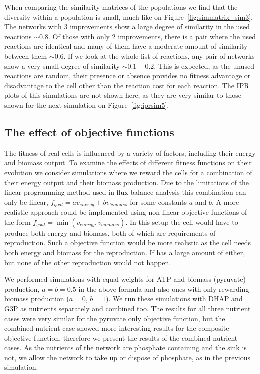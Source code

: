\documentclass[a4paper,12pt]{article}
\begin{document}
When comparing the similarity matrices of the populations we find that the diversity within a population is small, much like on Figure~\ref{fig:simmatrix_sim3}. The networks with $3$ improvements show a large degree of similarity in the used reactions $\sim 0.8$. Of those with only $2$ improvements, there is a pair where the used reactions are identical and many of them have a moderate amount of similarity between them $\sim 0.6$. If we look at the whole list of reactions, any pair of networks show a very small degree of similarity $\sim 0.1-0.2$. This is expected, as the unused reactions are random, their presence or absence provides no fitness advantage or disadvantage to the cell other than the reaction cost for each reaction. The IPR plots of this simulations are not shown here, as they are very similar to those shown for the next simulation on Figure~\ref{fig:iprsim5}. 

\subsection{The effect of objective functions}
\label{sub:goalfuncs}

The fitness of real cells is influenced by a variety of factors, including their energy and biomass output. To examine the effects of different fitness functions on their evolution we consider simulations where we reward the cells for a combination of their energy output and their biomass production. Due to the limitations of the linear programming method used in flux balance analysis this combination can only be linear, $f_{goal}=a v_{energy}+ b v_{biomass}$ for some constants $a$ and $b$. A more realistic approach could be implemented using non-linear objective functions of the form $f_{goal}=\min \left( v_{energy},v_{biomass} \right)$. In this setup the cell would have to produce both energy and biomass, both of which are requirements of reproduction. Such a objective function would be more realistic as the cell needs both energy and biomass for the reproduction. If has a large amount of either, but none of the other reproduction would not happen. 

We performed simulations with equal weights for ATP and biomass (pyruvate) production, $a=b=0.5$ in the above formula and also ones with only rewarding biomass production ($a=0$, $b=1$). We run these simulations with DHAP and G3P as nutrients separately and combined too. The results for all three nutrient cases were very similar for the pyruvate only objective function, but the combined nutrient case showed more interesting results for the composite objective function, therefore we present the results of the combined nutrient cases. As the nutrients of the network are phosphate containing and the sink is not, we allow the network to take up or dispose of phosphate, as in the previous simulation. 
\end{document}
